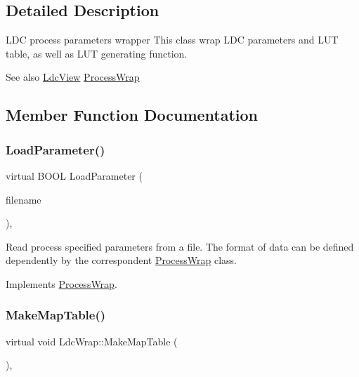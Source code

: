 \subsection{Detailed Description}
L\+DC process parameters wrapper This class wrap L\+DC parameters and L\+UT table, as well as L\+UT generating function. 

\begin{DoxySeeAlso}{See also}
\mbox{\hyperlink{class_ldc_view}{Ldc\+View}} \mbox{\hyperlink{class_process_wrap}{Process\+Wrap}} 
\end{DoxySeeAlso}


\subsection{Member Function Documentation}
\mbox{\label{class_ldc_wrap_a5409cdfe65bc28ec3779f35eb3af22b4}} 
\subsubsection{\texorpdfstring{Load\+Parameter()}{LoadParameter()}}
{\footnotesize\ttfamily virtual B\+O\+OL Load\+Parameter (\begin{DoxyParamCaption}\item[{L\+P\+C\+T\+S\+TR}]{filename }\end{DoxyParamCaption})\hspace{0.3cm}{\ttfamily [inline]}, {\ttfamily [virtual]}}

Read process specified parameters from a file. The format of data can be defined dependently by the correspondent \mbox{\hyperlink{class_process_wrap}{Process\+Wrap}} class. 

Implements \mbox{\hyperlink{class_process_wrap_a1cb75a423ff8f5ef736fc00a34792493}{Process\+Wrap}}.

\mbox{\label{class_ldc_wrap_a0c6a77b5857bf0bc57c935b8612df9ad}} 
\subsubsection{\texorpdfstring{Make\+Map\+Table()}{MakeMapTable()}}
{\footnotesize\ttfamily virtual void Ldc\+Wrap\+::\+Make\+Map\+Table (\begin{DoxyParamCaption}{ }\end{DoxyParamCaption})\hspace{0.3cm}{\ttfamily [inline]}, {\ttfamily [virtual]}}

